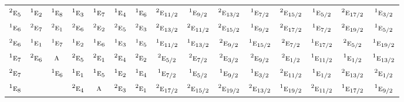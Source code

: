 \documentclass[10pt,a4paper]{article}
\numberwithin{equation}{section}
\newcommand{\irr}[1]{\text{\normalfont\scshape #1}}
\newcommand{\conjpair}[1]{{}^{#1}}
\begin{document}
{\begin{longtable}{@{}lcccccccccccccc@{}}
$\conjpair{2}\irr{e}_{5}$ & $\conjpair{1}\irr{e}_{2}$ & $\conjpair{1}\irr{e}_{8}$ & $\conjpair{1}\irr{e}_{3}$ & $\conjpair{1}\irr{e}_{7}$ & $\conjpair{1}\irr{e}_{4}$ & $\conjpair{1}\irr{e}_{6}$ & $\conjpair{2}\irr{e}_{11/2}$ & $\conjpair{1}\irr{e}_{9/2}$ & $\conjpair{2}\irr{e}_{13/2}$ & $\conjpair{1}\irr{e}_{7/2}$ & $\conjpair{2}\irr{e}_{15/2}$ & $\conjpair{1}\irr{e}_{5/2}$ & $\conjpair{2}\irr{e}_{17/2}$ & $\conjpair{1}\irr{e}_{3/2}$\\
$\conjpair{1}\irr{e}_{6}$ & $\conjpair{2}\irr{e}_{7}$ & $\conjpair{2}\irr{e}_{1}$ & $\conjpair{2}\irr{e}_{6}$ & $\conjpair{2}\irr{e}_{2}$ & $\conjpair{2}\irr{e}_{5}$ & $\conjpair{2}\irr{e}_{3}$ & $\conjpair{2}\irr{e}_{13/2}$ & $\conjpair{2}\irr{e}_{11/2}$ & $\conjpair{2}\irr{e}_{15/2}$ & $\conjpair{1}\irr{e}_{9/2}$ & $\conjpair{2}\irr{e}_{17/2}$ & $\conjpair{1}\irr{e}_{7/2}$ & $\conjpair{2}\irr{e}_{19/2}$ & $\conjpair{1}\irr{e}_{5/2}$\\
$\conjpair{2}\irr{e}_{6}$ & $\conjpair{1}\irr{e}_{1}$ & $\conjpair{1}\irr{e}_{7}$ & $\conjpair{1}\irr{e}_{2}$ & $\conjpair{1}\irr{e}_{6}$ & $\conjpair{1}\irr{e}_{3}$ & $\conjpair{1}\irr{e}_{5}$ & $\conjpair{1}\irr{e}_{11/2}$ & $\conjpair{1}\irr{e}_{13/2}$ & $\conjpair{2}\irr{e}_{9/2}$ & $\conjpair{1}\irr{e}_{15/2}$ & $\conjpair{2}\irr{e}_{7/2}$ & $\conjpair{1}\irr{e}_{17/2}$ & $\conjpair{2}\irr{e}_{5/2}$ & $\conjpair{1}\irr{e}_{19/2}$\\
$\conjpair{1}\irr{e}_{7}$ & $\conjpair{2}\irr{e}_{6}$ & $\irr{a}$ & $\conjpair{2}\irr{e}_{5}$ & $\conjpair{2}\irr{e}_{1}$ & $\conjpair{2}\irr{e}_{4}$ & $\conjpair{2}\irr{e}_{2}$ & $\conjpair{2}\irr{e}_{5/2}$ & $\conjpair{2}\irr{e}_{7/2}$ & $\conjpair{2}\irr{e}_{3/2}$ & $\conjpair{2}\irr{e}_{9/2}$ & $\conjpair{2}\irr{e}_{1/2}$ & $\conjpair{1}\irr{e}_{11/2}$ & $\conjpair{1}\irr{e}_{1/2}$ & $\conjpair{1}\irr{e}_{13/2}$\\
$\conjpair{2}\irr{e}_{7}$ &  & $\conjpair{1}\irr{e}_{6}$ & $\conjpair{1}\irr{e}_{1}$ & $\conjpair{1}\irr{e}_{5}$ & $\conjpair{1}\irr{e}_{2}$ & $\conjpair{1}\irr{e}_{4}$ & $\conjpair{1}\irr{e}_{7/2}$ & $\conjpair{1}\irr{e}_{5/2}$ & $\conjpair{1}\irr{e}_{9/2}$ & $\conjpair{1}\irr{e}_{3/2}$ & $\conjpair{2}\irr{e}_{11/2}$ & $\conjpair{1}\irr{e}_{1/2}$ & $\conjpair{2}\irr{e}_{13/2}$ & $\conjpair{2}\irr{e}_{1/2}$\\
$\conjpair{1}\irr{e}_{8}$ &  &  & $\conjpair{2}\irr{e}_{4}$ & $\irr{a}$ & $\conjpair{2}\irr{e}_{3}$ & $\conjpair{2}\irr{e}_{1}$ & $\conjpair{2}\irr{e}_{17/2}$ & $\conjpair{2}\irr{e}_{15/2}$ & $\conjpair{2}\irr{e}_{19/2}$ & $\conjpair{2}\irr{e}_{13/2}$ & $\conjpair{1}\irr{e}_{19/2}$ & $\conjpair{2}\irr{e}_{11/2}$ & $\conjpair{1}\irr{e}_{17/2}$ & $\conjpair{1}\irr{e}_{9/2}$\\

\end{longtable}}
\end{document}
